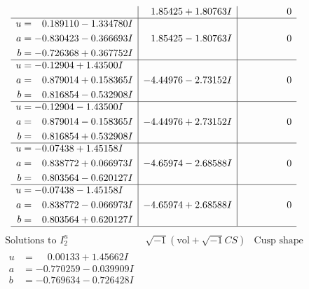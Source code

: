 \documentclass[1p]{elsarticle_modified}
\theoremstyle{definition}
\newcommand{\I}{\sqrt{-1}}
\begin{document}
$$\begin{array}{c|c|c}
 & \phantom{-}1.85425 + 1.80763 I & \phantom{-0.000000 } 0 \\ \hline\begin{aligned}
u &= \phantom{-}0.189110 - 1.334780 I \\
a &= -0.830423 - 0.366693 I \\
b &= -0.726368 + 0.367752 I\end{aligned}
 & \phantom{-}1.85425 - 1.80763 I & \phantom{-0.000000 } 0 \\ \hline\begin{aligned}
u &= -0.12904 + 1.43500 I \\
a &= \phantom{-}0.879014 + 0.158365 I \\
b &= \phantom{-}0.816854 - 0.532908 I\end{aligned}
 & -4.44976 - 2.73152 I & \phantom{-0.000000 } 0 \\ \hline\begin{aligned}
u &= -0.12904 - 1.43500 I \\
a &= \phantom{-}0.879014 - 0.158365 I \\
b &= \phantom{-}0.816854 + 0.532908 I\end{aligned}
 & -4.44976 + 2.73152 I & \phantom{-0.000000 } 0 \\ \hline\begin{aligned}
u &= -0.07438 + 1.45158 I \\
a &= \phantom{-}0.838772 + 0.066973 I \\
b &= \phantom{-}0.803564 - 0.620127 I\end{aligned}
 & -4.65974 - 2.68588 I & \phantom{-0.000000 } 0 \\ \hline\begin{aligned}
u &= -0.07438 - 1.45158 I \\
a &= \phantom{-}0.838772 - 0.066973 I \\
b &= \phantom{-}0.803564 + 0.620127 I\end{aligned}
 & -4.65974 + 2.68588 I & \phantom{-0.000000 } 0\\
 \hline 
 \end{array}$$\newpage$$\begin{array}{c|c|c}  
\text{Solutions to }I^u_{2}& \I (\text{vol} + \sqrt{-1}CS) & \text{Cusp shape}\\
 \hline 
\begin{aligned}
u &= \phantom{-}0.00133 + 1.45662 I \\
a &= -0.770259 - 0.039909 I \\
b &= -0.769634 - 0.726428 I\end{aligned}

\end{array}$$
\end{document}
